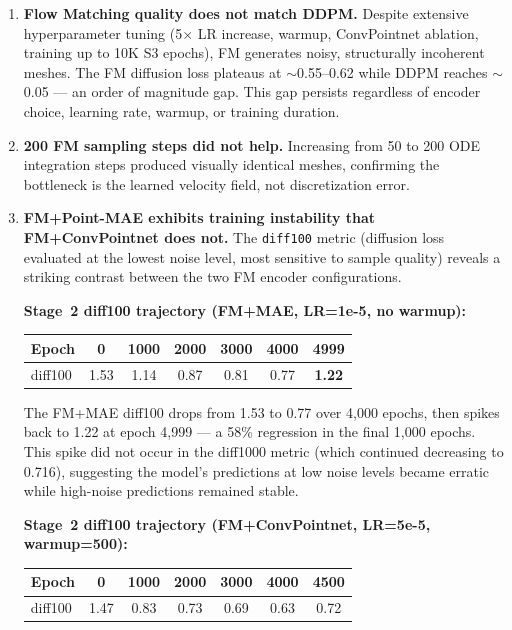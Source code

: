 \documentclass[11pt,letterpaper]{article}
\begin{document}
\begin{enumerate}
    \item \textbf{Flow Matching quality does not match DDPM.} Despite extensive hyperparameter tuning (5$\times$ LR increase, warmup, ConvPointnet ablation, training up to 10K S3 epochs), FM generates noisy, structurally incoherent meshes. The FM diffusion loss plateaus at ${\sim}$0.55--0.62 while DDPM reaches ${\sim}$0.05 --- an order of magnitude gap. This gap persists regardless of encoder choice, learning rate, warmup, or training duration.

    \item \textbf{200 FM sampling steps did not help.} Increasing from 50 to 200 ODE integration steps produced visually identical meshes, confirming the bottleneck is the learned velocity field, not discretization error.

    \item \textbf{FM+Point-MAE exhibits training instability that FM+ConvPointnet does not.} The \texttt{diff100} metric (diffusion loss evaluated at the lowest noise level, most sensitive to sample quality) reveals a striking contrast between the two FM encoder configurations.

    \textbf{Stage~2 diff100 trajectory (FM+MAE, LR=1e-5, no warmup):}

    \begin{table}[H]
    \centering
    \begin{tabular}{lcccccc}
    \toprule
    Epoch & 0 & 1000 & 2000 & 3000 & 4000 & 4999 \\
    \midrule
    diff100 & 1.53 & 1.14 & 0.87 & 0.81 & 0.77 & \textbf{1.22} \\
    \bottomrule
    \end{tabular}
    \end{table}

    The FM+MAE diff100 drops from 1.53 to 0.77 over 4{,}000 epochs, then spikes back to 1.22 at epoch 4{,}999 --- a 58\% regression in the final 1{,}000 epochs. This spike did not occur in the diff1000 metric (which continued decreasing to 0.716), suggesting the model's predictions at low noise levels became erratic while high-noise predictions remained stable.

    \textbf{Stage~2 diff100 trajectory (FM+ConvPointnet, LR=5e-5, warmup=500):}

    \begin{table}[H]
    \centering
    \begin{tabular}{lcccccc}
    \toprule
    Epoch & 0 & 1000 & 2000 & 3000 & 4000 & 4500 \\
    \midrule
    diff100 & 1.47 & 0.83 & 0.73 & 0.69 & 0.63 & 0.72 \\
    \bottomrule
    \end{tabular}
    \end{table}


\end{enumerate}
\end{document}
